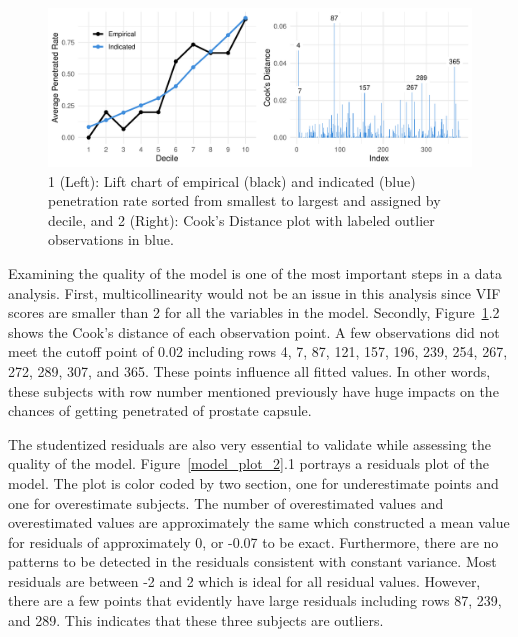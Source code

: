 \documentclass[11pt]{article}\usepackage[]{graphicx}\usepackage[]{color}
\makeatletter
\def\maxwidth{ %
  \ifdim\Gin@nat@width>\linewidth
    \linewidth
  \else
    \Gin@nat@width
  \fi
}
\makeatother
\begin{document}
\begin{figure}[h!] 
\begin{center}

\includegraphics[width=\maxwidth]{figure/unnamed-chunk-4-1} 

\caption{1 (Left): Lift chart of empirical (black) and indicated (blue) penetration rate sorted from smallest to largest and assigned by decile, and 2 (Right): Cook's Distance plot with labeled outlier observations in blue.}
\label{model_plot_1}
\end{center} 
\end{figure}

\noindent Examining the quality of the model is one of the most important steps in a data analysis. First, multicollinearity would not be an issue in this analysis since VIF scores are smaller than 2 for all the variables in the model. Secondly, Figure~\ref{model_plot_1}.2 shows the Cook's distance of each observation point. A few observations did not meet the cutoff point of 0.02 including rows 4, 7, 87, 121, 157, 196, 239, 254, 267, 272, 289, 307, and 365. These points influence all fitted values. In other words, these subjects with row number mentioned previously have huge impacts on the chances of getting penetrated of prostate capsule.    
\hfill \break

\noindent The studentized residuals are also very essential to validate while assessing the quality of the model. Figure~\ref{model_plot_2}.1 portrays a residuals plot of the model. The plot is color coded by two section, one for underestimate points and one for overestimate subjects. The number of overestimated values and overestimated values are approximately the same which constructed a mean value for residuals of approximately 0, or -0.07 to be exact. Furthermore, there are no patterns to be detected in the residuals consistent with constant variance. Most residuals are between -2 and 2 which is ideal for all residual values. However, there are a few points that evidently have large residuals including rows 87, 239, and 289. This indicates that these three subjects are outliers.        
\end{document}
